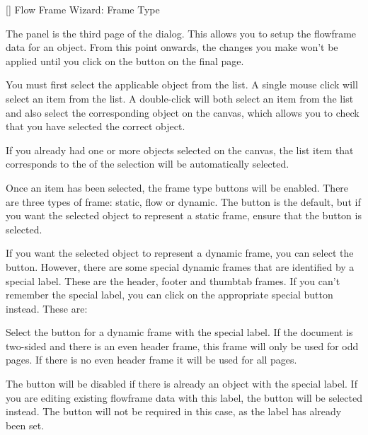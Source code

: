 
[]
{}
{Flow Frame Wizard: Frame Type}

The  panel is the third page of the
 dialog. This allows you to setup the
\gls{flowframe} data for an \gls{object}. From this point onwards,
the changes you make won't be applied until you click on the
 button on the final page.

You must first select the applicable \gls{object} from the
 list. A single mouse click will
select an item from the list. A double-click will both select an
item from the list and also select the corresponding \gls{object} on
the \gls{canvas}, which allows you to check that you have selected
the correct \gls{object}.

If you already had one or more \glspl{object} selected on the
\gls{canvas}, the list item that corresponds to the
 of the selection will be
automatically selected.

Once an item has been selected, the frame type buttons will be
enabled. There are three types of frame: static, flow or dynamic.
The  button is the default, but
if you want the selected object to represent a static frame, 
ensure that the  button is
selected.

If you want the selected object to represent a dynamic frame,
you can select the  button.
However, there are some special dynamic frames that are identified
by a special label. These are the header, footer and thumbtab
frames. If you can't remember the special label, you can click on
the appropriate special button instead. These are:

Select the  button for a dynamic frame
with the special  label. 
If the document is two-sided and there is an even header frame, this
frame will only be used for odd pages. If there is no even header
frame it will be used for all pages.

The  button will be disabled if
there is already an object with the special  label.
If you are editing existing \gls{flowframe} data with this label, the 
 button will be selected
instead. The  button will not be
required in this case, as the label has already been set.

